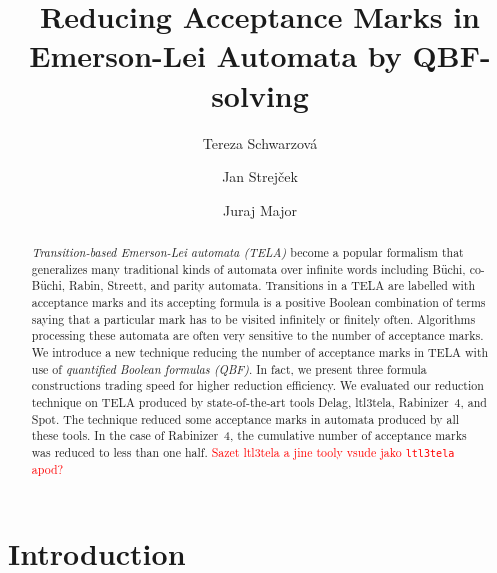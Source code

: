 \documentclass[a4paper,UKenglish,cleveref, autoref, thm-restate]{lipics-v2021}
\title{Reducing Acceptance Marks in Emerson-Lei Automata by QBF-solving}
\author{Tereza Schwarzov\'{a}}{Faculty of Informatics, Masaryk University, Brno, Czech Republic}{xschwar3@mail.muni.cz}{}{}
\author{Jan Strej\v{c}ek}{Faculty of Informatics, Masaryk University, Brno, Czech Republic}{strejcek@fi.muni.cz}{https://orcid.org/0000-0001-5873-403X}{}
\author{Juraj Major}{Faculty of Informatics, Masaryk University, Brno, Czech Republic}{major@fi.muni.cz}{}{}
\newcommand{\todo}[1]{\textcolor{red}{#1}}
\begin{document}
\maketitle


\begin{abstract}
  \emph{Transition-based Emerson-Lei automata (TELA)} become a popular
  formalism that generalizes many traditional kinds of automata over
  infinite words including Büchi, co-Büchi, Rabin, Streett, and parity
  automata. Transitions in a TELA are labelled with acceptance marks
  and its accepting formula is a positive Boolean combination of terms
  saying that a particular mark has to be visited infinitely or
  finitely often. %
  Algorithms processing these automata are often very sensitive to the
  number of %
  acceptance marks. We introduce a new technique reducing the number
  of %
  acceptance marks in TELA with use of \emph{quantified Boolean
    formulas (QBF)}.
  In fact, we present three formula constructions
  trading speed for higher reduction
  efficiency. We evaluated our reduction technique on TELA produced by
  state-of-the-art tools Delag, ltl3tela, Rabinizer~4, and Spot. The
  technique reduced some acceptance marks in automata produced by all
  these tools. In the case of Rabinizer~4, the cumulative number of
  acceptance marks was reduced to less than one half. \todo{Sazet ltl3tela a jine tooly vsude jako \texttt{ltl3tela} apod?}
\end{abstract}



\section{Introduction}

\end{document}
